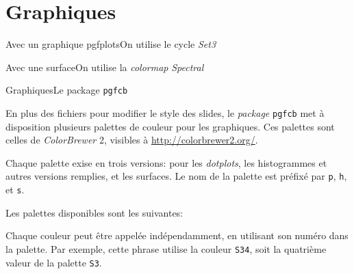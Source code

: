 \documentclass{eecslides}
\begin{document}
	\section{Graphiques}

	\begin{frame}{Avec un graphique pgfplots}{On utilise le cycle \emph{Set3}}
		\begin{center}
			
		\end{center}	
	\end{frame}

	\begin{frame}{Avec une surface}{On utilise la \emph{colormap} \emph{Spectral}}
		\begin{center}
			
		\end{center}	
	\end{frame}

	\begin{frame}[allowframebreaks]{Graphiques}{Le package \texttt{pgfcb}}
	    
		En plus des fichiers pour modifier le style des slides, le \emph{package} \texttt{pgfcb} met à disposition plusieurs palettes de couleur pour les graphiques. Ces palettes sont celles de \emph{ColorBrewer} 2, visibles à \url{http://colorbrewer2.org/}.

		\framebreak

		Chaque palette exise en trois versions: pour les \emph{dotplots}, les histogrammes et autres versions remplies, et les surfaces. Le nom de la palette est préfixé par \texttt{p}, \texttt{h}, et \texttt{s}.

		\framebreak

		Les palettes disponibles sont les suivantes:

		\framebreak

		Chaque \alert{couleur} peut être appelée indépendamment, en utilisant son numéro dans la palette. Par exemple, cette phrase {\color{S34} utilise la couleur \texttt{S34}}, soit la quatrième valeur de la palette \texttt{S3}. 


	\end{frame}
\end{document}
